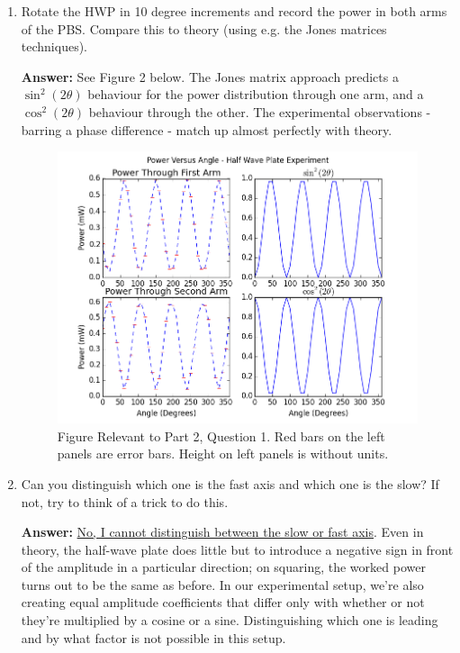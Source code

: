 \documentclass[10pt,a4paper]{article}
\begin{document}
\begin{enumerate}
\item Rotate the HWP in 10 degree increments and record the power in both arms of the PBS. Compare this to theory (using e.g. the Jones matrices techniques).

\textbf{Answer: } See Figure 2 below. The Jones matrix approach predicts a $\sin^{2}\left(2\theta\right)$ behaviour for the power distribution through one arm, and a $\cos^{2}\left(2\theta\right)$ behaviour through the other. The experimental observations - barring a phase difference - match up almost perfectly with theory.
\begin{figure}[t!]
\centering
\includegraphics[scale = 0.6]{../Analysis/figure_2.png}
\caption{Figure Relevant to Part 2, Question 1. Red bars on the left panels are error bars. Height on left panels is without units.} 
\end{figure}
\item Can you distinguish which one is the fast axis and which one is the slow? If not, try to think of a trick to do this.

\textbf{Answer: } \ul{No, I cannot distinguish between the slow or fast axis}. Even in theory, the half-wave plate does little but to introduce a negative sign in front of the amplitude in a particular direction; on squaring, the worked power turns out to be the same as before. In our experimental setup, we're also creating equal amplitude coefficients that differ only with whether or not they're multiplied by a cosine or a sine. Distinguishing which one is leading and by what factor is not possible in this setup.


\end{enumerate}
\end{document}
